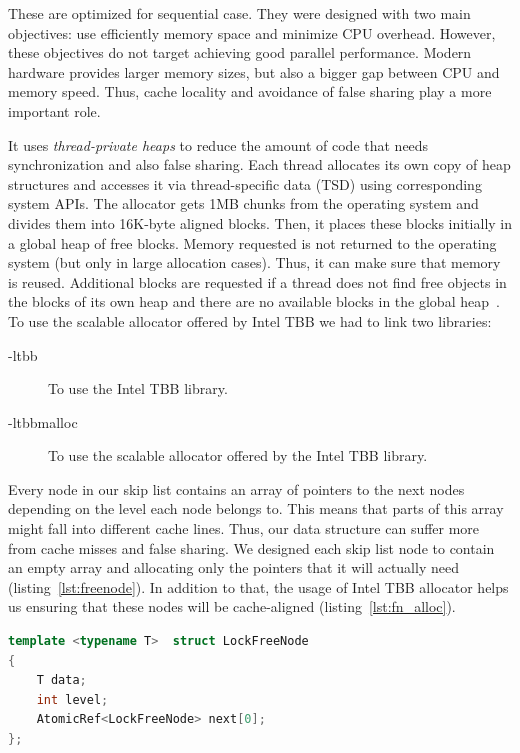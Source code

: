 These are optimized for sequential case. They were designed with two main objectives: use efficiently memory space and minimize CPU overhead. However, these objectives do not target achieving good parallel performance. Modern hardware provides larger memory sizes, but also a bigger gap between CPU and memory speed. Thus, cache locality and avoidance of false sharing play a more important role.

It uses \textit{thread-private heaps} to reduce the amount of code that needs synchronization and also false sharing. Each thread allocates its own copy of heap structures and accesses it via thread-specific data (TSD) using corresponding system APIs.
The allocator gets 1MB chunks from the operating system and divides them into 16K-byte aligned blocks. Then, it places these blocks initially in a global heap of free blocks. Memory requested is not returned to the operating system (but only in large allocation cases). Thus, it can make sure that memory is reused. Additional blocks are requested if a thread does not find free objects in the blocks of its own heap and there are no available blocks in the global heap~\cite{_thefoundations,Hudson:2006:MST:1133956.1133967}.
To use the scalable allocator offered by Intel TBB we had to link two libraries:
\begin{description}
	\item[-ltbb] To use the Intel TBB library.
	\item[-ltbbmalloc] To use the scalable allocator offered by the Intel TBB library.
\end{description}
 
Every node in our skip list contains an array of pointers to the next nodes depending on the level each node belongs to. This means that parts of this array might fall into different cache lines. Thus, our data structure can suffer more from cache misses and false sharing. We designed each skip list node to contain an empty array and allocating only the pointers that it will actually need (listing~\ref{lst:freenode}). In addition to that, the usage of Intel TBB allocator helps us ensuring that these nodes will be cache-aligned (listing~\ref{lst:fn_alloc}).

\begin{lstlisting}[language=C++,basicstyle=\tt\footnotesize,captionpos=b,caption=Lock free node structure,label=lst:freenode,morekeywords={*, size_t}]
template <typename T>  struct LockFreeNode
{	
	T data;
	int	level;
	AtomicRef<LockFreeNode>	next[0];
};
\end{lstlisting}

